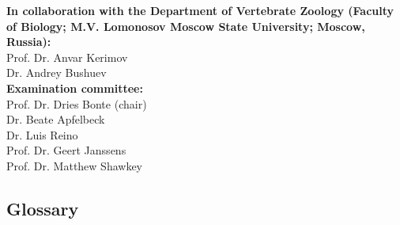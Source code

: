 \documentclass[10pt, twoside]{book} %
\begin{document}
		{\small \noindent \textbf{In collaboration with the Department of Vertebrate Zoology (Faculty of Biology; M.V. Lomonosov Moscow State University; Moscow, Russia):} \\
			\hspace{10mm}Prof. Dr. Anvar Kerimov\\
			\hspace{10mm}Dr. Andrey Bushuev}\\

	{\small \noindent \textbf{Examination committee:}\\
		\hspace{10mm}Prof. Dr. Dries Bonte (chair) \\
		\hspace{10mm}Dr. Beate Apfelbeck\\
		\hspace{10mm}Dr. Luis Reino\\
		\hspace{10mm}Prof. Dr. Geert Janssens\\
		\hspace{10mm}Prof. Dr. Matthew Shawkey} \\
	



	\newpage{\thispagestyle{empty}\cleardoublepage}
	{\tableofcontents}
	



\clearpage



\newpage
\subsection*{Glossary}
\end{document}

